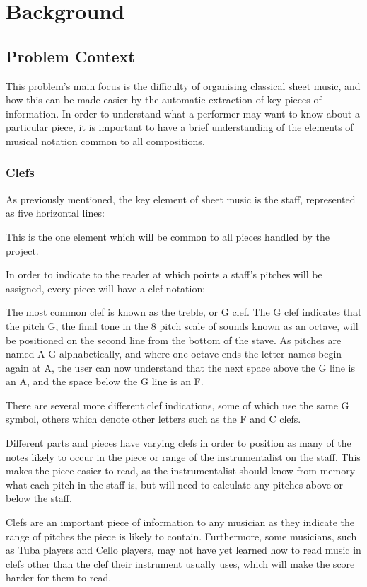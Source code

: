\section{Background}
\subsection{Problem Context}
This problem's main focus is the difficulty of organising classical sheet music, and how this can be made easier by the automatic extraction of key pieces  of information. In order to understand what a performer may want to know about a particular piece, it is important to have a brief understanding of the elements of musical notation common to all compositions.
\subsubsection{Clefs}
As previously mentioned, the key element of sheet music is the staff, represented as five horizontal lines:

This is the one element which will be common to all pieces handled by the project. 

In order to indicate to the reader at which points a staff's pitches will be assigned, every piece will have a clef notation:

The most common clef is known as the treble, or G clef. The G clef indicates that the pitch G, the final tone in the 8 pitch scale of sounds known as an octave, will be positioned on the second line from the bottom of the stave. As pitches are named A-G alphabetically, and where one octave ends the letter names begin again at A, the user can now understand that the next space above the G line is an A, and the space below the G line is an F. 

There are several more different clef indications, some of which use the same G symbol, others which denote other letters such as the F and C clefs.

Different parts and pieces have varying clefs in order to position as many of the notes likely to occur in the piece or range of the instrumentalist on the staff. This makes the piece easier to read, as the instrumentalist should know from memory what each pitch in the staff is, but will need to calculate any pitches above or below the staff.

Clefs are an important piece of information to any musician as they indicate the range of pitches the piece is likely to contain. Furthermore, some musicians, such as Tuba players and Cello players, may not have yet learned how to read music in clefs other than the clef their instrument usually uses, which will make the score harder for them to read.


